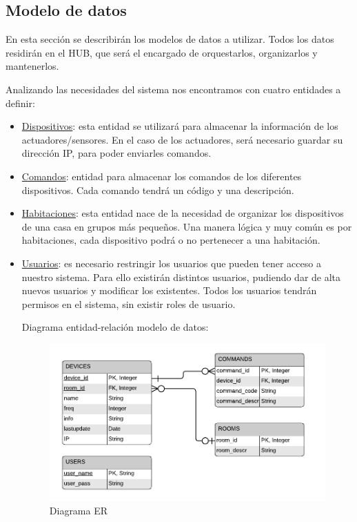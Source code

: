 \subsection{Modelo de datos}
En esta sección se describirán los modelos de datos a utilizar. Todos los datos residirán en el HUB, que será el encargado de orquestarlos,
organizarlos y mantenerlos.
\par
Analizando las necesidades del sistema nos encontramos con cuatro entidades a definir:
\begin{itemize}
\item \underline{Dispositivos}: esta entidad se utilizará para almacenar la información de los actuadores/sensores. En el caso de los actuadores,
será necesario guardar su dirección IP, para poder enviarles comandos.
\item \underline{Comandos}: entidad para almacenar los comandos de los diferentes dispositivos. Cada comando tendrá un código y una descripción.
\item \underline{Habitaciones}: esta entidad nace de la necesidad de organizar los dispositivos de una casa en grupos más pequeños. Una manera lógica 
y muy común es por habitaciones, cada dispositivo podrá o no pertenecer a una habitación.
\item \underline{Usuarios}: es necesario restringir los usuarios que pueden tener acceso a nuestro sistema. Para ello existirán distintos usuarios, pudiendo
dar de alta nuevos usuarios y modificar los existentes. Todos los usuarios tendrán permisos en el sistema, sin existir roles de usuario. 
\par
Diagrama entidad-relación modelo de datos:
\begin{figure}[H]
\centering
\includegraphics[width=6.00in]{images/er_brimo.png}
\caption{Diagrama ER}
\label{fig:diagrama-er}
\end{figure}

\end{itemize}
